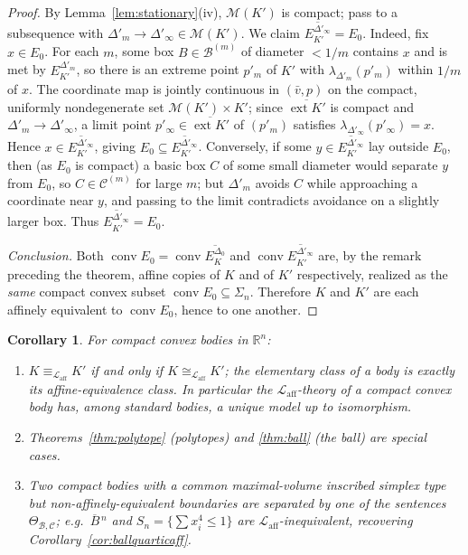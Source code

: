 \documentclass[11pt]{amsart}
\newtheorem{corollary}[theorem]{Corollary}
\theoremstyle{definition}
\newcommand{\R}{\mathbb{R}}
\newcommand{\Laff}{\mathcal{L}_{\mathrm{aff}}}
\newcommand{\conv}{\operatorname{conv}}
\newcommand{\ext}{\operatorname{ext}}
\newcommand{\Ball}{\overline{B}{}^{\,n}}
\begin{document}
\begin{proof}
By Lemma~\ref{lem:stationary}(iv), $\mathcal M(K')$ is compact; pass to a
subsequence with $\Delta'_m\to\Delta'_\infty\in\mathcal M(K')$. We claim
$\overline{E_{K'}^{\Delta'_\infty}}=E_0$. Indeed, fix $x\in E_0$. For each
$m$, some box $B\in\mathcal B^{(m)}$ of diameter $<1/m$ contains $x$ and is
met by $E_{K'}^{\Delta'_m}$, so there is an extreme point $p'_m$ of $K'$ with
$\lambda_{\Delta'_m}(p'_m)$ within $1/m$ of $x$. The coordinate map is jointly
continuous in $(\bar v,p)$ on the compact, uniformly nondegenerate set
$\mathcal M(K')\times K'$; since $\overline{\ext K'}$ is compact and
$\Delta'_m\to\Delta'_\infty$, a limit point $p'_\infty\in\overline{\ext K'}$
of $(p'_m)$ satisfies $\lambda_{\Delta'_\infty}(p'_\infty)=x$. Hence
$x\in\overline{E_{K'}^{\Delta'_\infty}}$, giving
$E_0\subseteq\overline{E_{K'}^{\Delta'_\infty}}$. Conversely, if some
$y\in\overline{E_{K'}^{\Delta'_\infty}}$ lay outside $E_0$, then (as $E_0$ is
compact) a basic box $C$ of some small diameter would separate $y$ from
$E_0$, so $C\in\mathcal C^{(m)}$ for large $m$; but $\Delta'_m$ avoids $C$
while approaching a coordinate near $y$, and passing to the limit contradicts
avoidance on a slightly larger box. Thus
$\overline{E_{K'}^{\Delta'_\infty}}=E_0$.

\emph{Conclusion.} Both $\conv E_0=\conv\overline{E_K^{\Delta_0}}$ and
$\conv\overline{E_{K'}^{\Delta'_\infty}}$ are, by the remark preceding the
theorem, affine copies of $K$ and of $K'$ respectively, realized as the
\emph{same} compact convex subset $\conv E_0\subseteq\Sigma_n$. Therefore $K$
and $K'$ are each affinely equivalent to $\conv E_0$, hence to one another.
\end{proof}

\begin{corollary}\label{cor:affine-consequences}
For compact convex bodies in $\R^n$:
\begin{enumerate}[label=\textup{(\roman*)}]
\item $K\equiv_{\Laff}K'$ if and only if $K\cong_{\Laff}K'$; the elementary
class of a body is exactly its affine-equivalence class. In particular the
$\Laff$-theory of a compact convex body has, among standard bodies, a unique
model up to isomorphism.
\item Theorems~\ref{thm:polytope} \textup(polytopes\textup) and
\ref{thm:ball} \textup(the ball\textup) are special cases.
\item Two compact bodies with a common maximal-volume inscribed simplex type
but non-affinely-equivalent boundaries are separated by one of the sentences
$\Theta_{\mathcal B,\mathcal C}$; e.g.\ $\Ball$ and $S_n=\{\sum x_i^4\le1\}$
are $\Laff$-inequivalent, recovering Corollary~\ref{cor:ballquarticaff}.
\end{enumerate}
\end{corollary}
\end{document}
